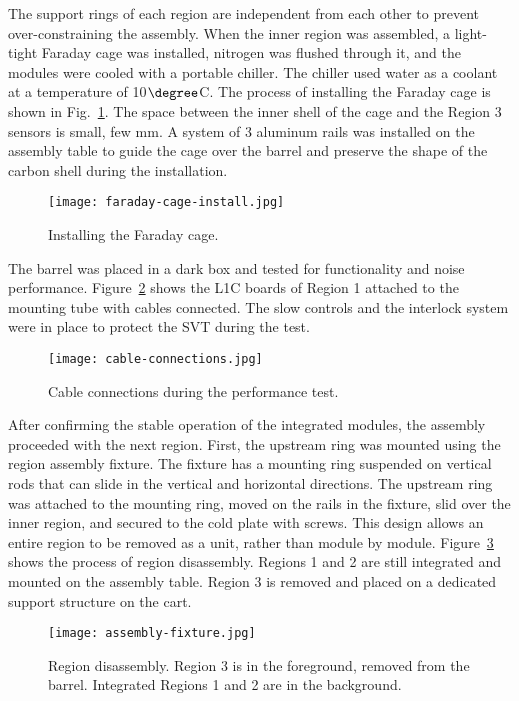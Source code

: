 The support rings of each region are independent from each other to prevent over-constraining the assembly. When the inner region was assembled, a light-tight Faraday cage was installed, nitrogen was flushed through it, and the modules were cooled with a portable chiller. The chiller used water as a coolant at a temperature of 10$\degree$C. The process of installing the Faraday cage is shown in Fig.~\ref{fig:faraday-cage-install}. The space between the inner shell of the cage and the Region 3 sensors is small, few mm. A system of 3 aluminum rails was installed on the assembly table to guide the cage over the barrel and preserve the shape of the carbon shell during the installation. 

\begin{figure}[hbt] 
\centering 
\texttt{[image: faraday-cage-install.jpg]}
\caption{Installing the Faraday cage.}
\label{fig:faraday-cage-install}
\end{figure}

The barrel was placed in a dark box and tested for functionality and noise performance. Figure~\ref{fig:cable-connections} shows the L1C boards of Region 1 attached to the mounting tube with cables connected. The slow controls and the interlock system were in place to protect the SVT during the test.

\begin{figure}[hbt] 
\centering 
\texttt{[image: cable-connections.jpg]}
\caption{Cable connections during the performance test.}
\label{fig:cable-connections}
\end{figure}
 
After confirming the stable operation of the integrated modules, the assembly proceeded with the next region. First, the upstream ring was mounted using the region assembly fixture. The fixture has a mounting ring suspended on vertical rods that can slide in the vertical and horizontal directions. The upstream ring was attached to the mounting ring, moved on the rails in the fixture, slid over the inner region, and secured to the cold plate with screws. This design allows an entire region to be removed as a unit, rather than module by module. Figure~\ref{fig:assembly-fixture} shows the process of region disassembly. Regions 1 and 2 are still integrated and mounted on the assembly table. Region 3 is removed and placed on a dedicated support structure on the cart.

\begin{figure}[hbt] 
\centering 
\texttt{[image: assembly-fixture.jpg]}
\caption{Region disassembly. Region 3 is in the foreground, removed from the barrel. Integrated Regions 1 and 2 are in the background.}
\label{fig:assembly-fixture}
\end{figure}

